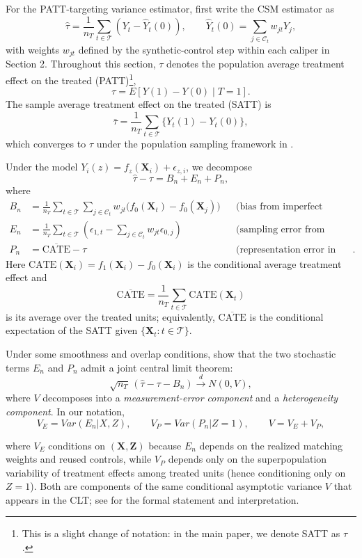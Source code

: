 \documentclass[11pt]{article}
\newcommand{\bX}{\mathbf{X}}
\begin{document}
For the PATT-targeting variance estimator, first write the CSM estimator as
\[
\hat{\tau}
= \frac{1}{n_T} \sum_{t \in \mathcal{T}} \left( Y_t - \hat{Y}_t(0) \right),
\qquad
\hat{Y}_t(0)=\sum_{j\in\mathcal{C}_t} w_{jt} Y_j,
\]
with weights $w_{jt}$ defined by the synthetic-control step within each caliper in Section 2.
Throughout this section, $\tau$ denotes the population average treatment effect on the treated (PATT)\footnote{This is a slight change of notation: in the main paper, we denote SATT as $\tau$.},
\[
\tau
=E\!\left[Y(1)-Y(0)\mid T=1\right].
\]
The sample average treatment effect on the treated (SATT) is
\[
\bar{\tau}
=\frac{1}{n_T}\sum_{t\in\mathcal{T}}\{Y_t(1)-Y_t(0)\},
\]
which converges to $\tau$ under the population sampling framework in \citet{meng2025varianceestimationmatchingreweighting}.

Under the model $Y_i(z)=f_z(\bX_i)+\epsilon_{z,i}$, we decompose
\[
\hat{\tau}-\tau
= B_n + E_n + P_n,
\]
where
\begin{align*}
B_n
&=
\frac{1}{n_T} \sum_{t \in \mathcal{T}} \sum_{j \in \mathcal{C}_t}
    w_{jt} \bigl( f_0(\bX_t) - f_0(\bX_j) \bigr)
    && \text{(bias from imperfect matching)}\\[2pt]
E_n
&=
\frac{1}{n_T} \sum_{t \in \mathcal{T}}
    \left( \epsilon_{1,t} - \sum_{j \in \mathcal{C}_t} w_{jt} \epsilon_{0,j} \right)
    && \text{(sampling error from residual noise)}\\[2pt]
P_n
&=
\overline{\text{CATE}}-\tau
    && \text{(representation error in treated covariates)}.
\end{align*}
Here $\text{CATE}(\bX_i)=f_1(\bX_i)-f_0(\bX_i)$ is the conditional average treatment effect and
\[
\overline{\text{CATE}}
=\frac{1}{n_T}\sum_{t\in\mathcal{T}}\text{CATE}(\bX_t)
\]
is its average over the treated units; equivalently, $\overline{\text{CATE}}$ is the conditional expectation of the SATT given $\{\bX_t:t\in\mathcal{T}\}$.

Under some smoothness and overlap conditions, \citet{meng2025varianceestimationmatchingreweighting} show that the two stochastic terms $E_n$ and $P_n$ admit a joint central limit theorem:
\[
\sqrt{n_T}\,(\hat{\tau}-\tau-B_n)
\overset{d}{\longrightarrow}
N(0,V),
\]
where $V$ decomposes into a \emph{measurement-error component} and a \emph{heterogeneity component}. In our notation,
\[
V_E=Var(E_n|X, Z),
\qquad
V_P=Var(P_n|Z=1),
\qquad
V = V_E + V_P,
\]

where $V_E$ conditions on $(\bX,\mathbf{Z})$ because $E_n$ depends on the realized matching weights and reused controls, while $V_P$ depends only on the superpopulation variability of treatment effects among treated units (hence conditioning only on $Z=1$).
Both are components of the same conditional asymptotic variance $V$ that appears in the CLT; see \citet{meng2025varianceestimationmatchingreweighting} for the formal statement and interpretation.
\end{document}

